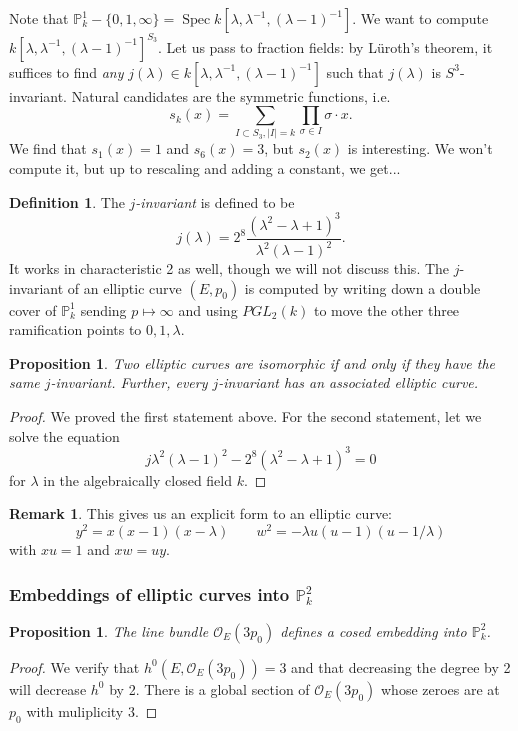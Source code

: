 \documentclass[10pt]{article}
\newtheorem{prop}[thm]{Proposition}
\theoremstyle{definition}
\newtheorem{defn}[thm]{Definition}
\newtheorem{rmk}[thm]{Remark}
\DeclareMathOperator{\Spec}{Spec}
\newcommand{\PP}{\mathbb{P}}
\newcommand{\OO}{\mathcal{O}}
\begin{document}
Note that $\PP^1_k - \{0, 1, \infty\} = \Spec k[\lambda, \lambda^{-1}, (\lambda-1)^{-1}]$.  We want to compute $k[\lambda, \lambda^{-1}, (\lambda-1)^{-1}]^{S_3}$.  Let us pass to fraction fields: by L\"{u}roth's theorem, it suffices to find \emph{any} $j(\lambda) \in k[\lambda, \lambda^{-1}, (\lambda-1)^{-1}]$ such that $j(\lambda)$ is $S^3$-invariant.  Natural candidates are the symmetric functions, i.e.
$$s_k(x) = \sum_{I \subset S_3, |I|=k} \prod_{\sigma \in I} \sigma \cdot x.$$
We find that $s_1(x) = 1$ and $s_6(x) = 3$, but $s_2(x)$ is interesting.  We won't compute it, but up to rescaling and adding a constant, we get...

\begin{defn}
The \emph{$j$-invariant} is defined to be
$$j(\lambda) = 2^8 \frac{(\lambda^2 - \lambda +1)^3}{\lambda^2 (\lambda - 1)^2}.$$
It works in characteristic 2 as well, though we will not discuss this.  The $j$-invariant of an elliptic curve $(E, p_0)$ is computed by writing down a double cover of $\PP^1_k$ sending $p \mapsto \infty$ and using $PGL_2(k)$ to move the other three ramification points to $0, 1, \lambda$.
\end{defn}

\begin{prop}
Two elliptic curves are isomorphic if and only if they have the same $j$-invariant.  Further, every $j$-invariant has an associated elliptic curve.
\end{prop}
\begin{proof}
We proved the first statement above.  For the second statement, let we solve the equation
$$j \lambda^2(\lambda - 1)^2 - 2^8(\lambda^2 - \lambda + 1)^3 = 0$$
for $\lambda$ in the algebraically closed field $k$.
\end{proof}

\begin{rmk}
This gives us an explicit form to an elliptic curve:
$$y^2 = x(x-1)(x-\lambda) \;\;\;\;\;\;\; w^2 = -\lambda u(u-1)(u-1/\lambda)$$
with $xu=1$ and $xw = uy$.
\end{rmk}


\subsubsection{Embeddings of elliptic curves into $\PP^2_k$}

\begin{prop}
The line bundle $\OO_E(3p_0)$ defines a cosed embedding into $\PP^2_k$.
\end{prop}
\begin{proof}
We verify that $h^0(E, \OO_E(3p_0)) = 3$ and that decreasing the degree by 2 will decrease $h^0$ by 2.  There is a global section of $\OO_E(3p_0)$ whose zeroes are at $p_0$ with muliplicity 3.  
\end{proof}
\end{document}
